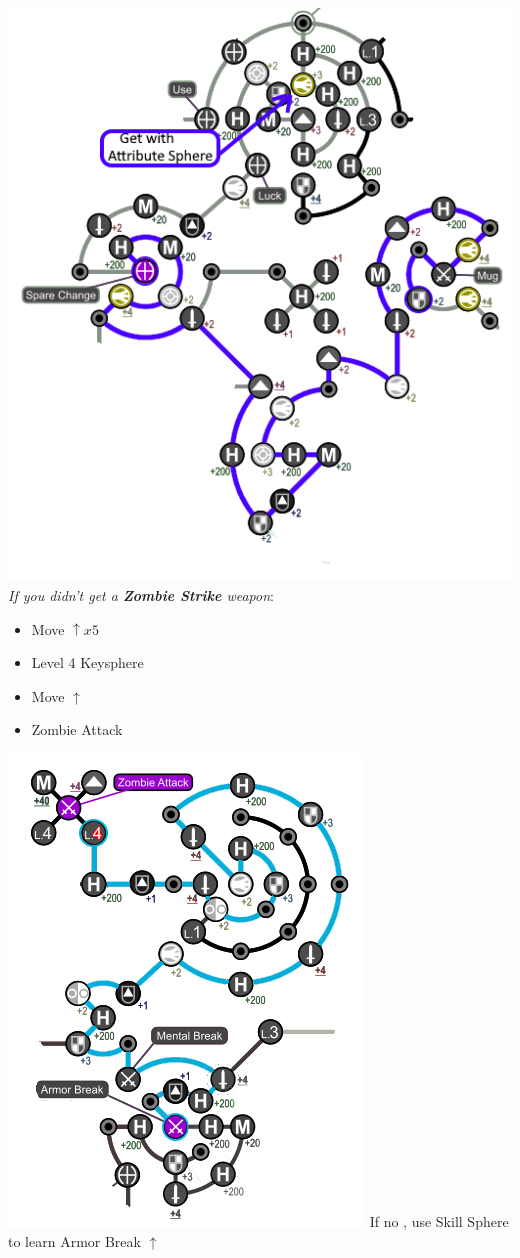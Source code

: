 \begin{spheregrid}
\begin{multicols}{2}
\begin{itemize}
				\includegraphics[width=.8\columnwidth]{graphics/0_return_before_BFA}
				\columnbreak
			\tidusf \textit{If you didn't get a \textbf{Zombie Strike} weapon}:
				\begin{itemize}
					\item Move $\uparrow x5$
					\item Level 4 Keysphere
					\item Move $\uparrow$
					\item Zombie Attack
				\end{itemize}
			\includegraphics[width=.8\columnwidth]{graphics/Tidus_BFA}
			\rikkuf If no \od, use Skill Sphere to learn Armor Break $\uparrow$
		\end{itemize}
	\end{multicols}
\end{spheregrid}
